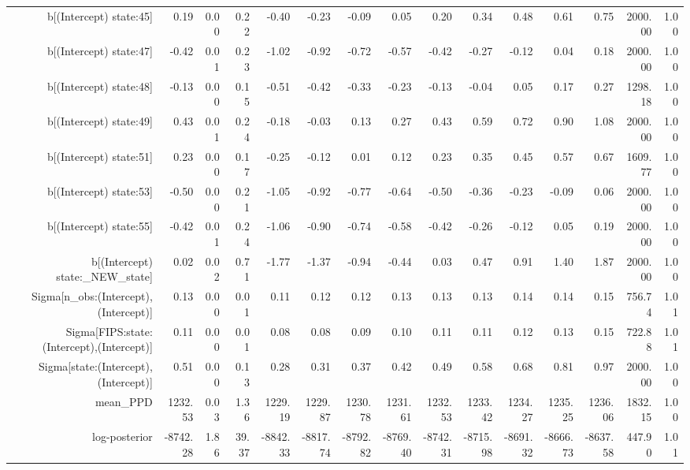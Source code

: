 \begin{table}[ht]
\begin{tabular}{rrrrrrrrrrrrrrr}
  b[(Intercept) state:45] & 0.19 & 0.00 & 0.22 & -0.40 & -0.23 & -0.09 & 0.05 & 0.20 & 0.34 & 0.48 & 0.61 & 0.75 & 2000.00 & 1.00 \\ 
  b[(Intercept) state:47] & -0.42 & 0.01 & 0.23 & -1.02 & -0.92 & -0.72 & -0.57 & -0.42 & -0.27 & -0.12 & 0.04 & 0.18 & 2000.00 & 1.00 \\ 
  b[(Intercept) state:48] & -0.13 & 0.00 & 0.15 & -0.51 & -0.42 & -0.33 & -0.23 & -0.13 & -0.04 & 0.05 & 0.17 & 0.27 & 1298.18 & 1.00 \\ 
  b[(Intercept) state:49] & 0.43 & 0.01 & 0.24 & -0.18 & -0.03 & 0.13 & 0.27 & 0.43 & 0.59 & 0.72 & 0.90 & 1.08 & 2000.00 & 1.00 \\ 
  b[(Intercept) state:51] & 0.23 & 0.00 & 0.17 & -0.25 & -0.12 & 0.01 & 0.12 & 0.23 & 0.35 & 0.45 & 0.57 & 0.67 & 1609.77 & 1.00 \\ 
  b[(Intercept) state:53] & -0.50 & 0.00 & 0.21 & -1.05 & -0.92 & -0.77 & -0.64 & -0.50 & -0.36 & -0.23 & -0.09 & 0.06 & 2000.00 & 1.00 \\ 
  b[(Intercept) state:55] & -0.42 & 0.01 & 0.24 & -1.06 & -0.90 & -0.74 & -0.58 & -0.42 & -0.26 & -0.12 & 0.05 & 0.19 & 2000.00 & 1.00 \\ 
  b[(Intercept) state:\_NEW\_state] & 0.02 & 0.02 & 0.71 & -1.77 & -1.37 & -0.94 & -0.44 & 0.03 & 0.47 & 0.91 & 1.40 & 1.87 & 2000.00 & 1.00 \\ 
  Sigma[n\_obs:(Intercept),(Intercept)] & 0.13 & 0.00 & 0.01 & 0.11 & 0.12 & 0.12 & 0.13 & 0.13 & 0.13 & 0.14 & 0.14 & 0.15 & 756.74 & 1.01 \\ 
  Sigma[FIPS:state:(Intercept),(Intercept)] & 0.11 & 0.00 & 0.01 & 0.08 & 0.08 & 0.09 & 0.10 & 0.11 & 0.11 & 0.12 & 0.13 & 0.15 & 722.88 & 1.01 \\ 
  Sigma[state:(Intercept),(Intercept)] & 0.51 & 0.00 & 0.13 & 0.28 & 0.31 & 0.37 & 0.42 & 0.49 & 0.58 & 0.68 & 0.81 & 0.97 & 2000.00 & 1.00 \\ 
  mean\_PPD & 1232.53 & 0.03 & 1.36 & 1229.19 & 1229.87 & 1230.78 & 1231.61 & 1232.53 & 1233.42 & 1234.27 & 1235.25 & 1236.06 & 1832.15 & 1.00 \\ 
  log-posterior & -8742.28 & 1.86 & 39.37 & -8842.33 & -8817.74 & -8792.82 & -8769.40 & -8742.31 & -8715.98 & -8691.32 & -8666.73 & -8637.58 & 447.90 & 1.01 \\ 
   \hline
\end{tabular}
\end{table}
